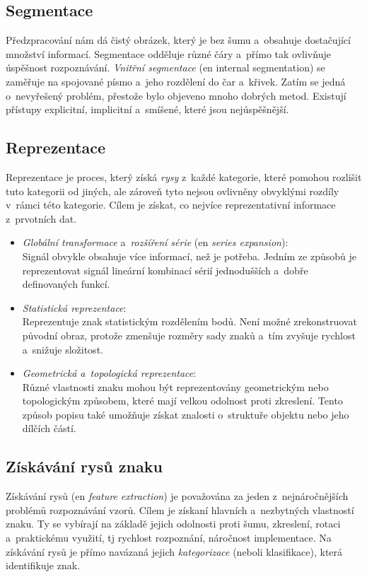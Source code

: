 \documentclass[12pt,oneside]{report}			%
\begin{document}
	\subsection{Segmentace}
	\label{sec:extraction}
	Předzpracování nám dá čistý obrázek, který je bez šumu a~obsahuje dostačující množství informací. Segmentace odděluje různé čáry a~přímo tak ovlivňuje úspěšnost rozpoznávání. \emph{Vnitřní segmentace} (\gls{en} internal segmentation) se zaměřuje na spojované písmo a~jeho rozdělení do čar a~křivek. Zatím se jedná o~nevyřešený problém, přestože bylo objeveno mnoho dobrých metod. Existují přístupy explicitní, implicitní a~smíšené, které jsou nejúspěšnější.\parencite[\gls{s} 22]{chaudhuri2017optical}
	\subsection{Reprezentace}
	Reprezentace je proces, který získá \emph{rysy} z~každé kategorie, které pomohou rozlišit tuto kategorii od jiných, ale zároveň tyto nejsou ovlivněny obvyklými rozdíly v~rámci této kategorie. Cílem je získat, co nejvíce reprezentativní informace z~prvotních dat.
	\begin{itemize}
	\item{\emph{Globální transformace} a~\emph{rozšíření série} (\gls{en} \emph{series expansion}):\\Signál obvykle obsahuje více informací, než je potřeba. Jedním ze způsobů je reprezentovat signál lineární kombinací sérií jednodušších a~dobře definovaných funkcí.}
	\item{\emph{Statistická reprezentace}:\\ Reprezentuje znak statistickým rozdělením bodů. Není možné zrekonstruovat původní obraz, protože zmenšuje rozměry sady znaků a~tím zvyšuje rychlost a~snižuje složitost.}
	\item{\emph{Geometrická a~topologická reprezentace}: \\Různé vlastnosti znaku mohou být reprezentovány geometrickým nebo topologickým způsobem, které mají velkou odolnost proti zkreslení. Tento způsob popisu také umožňuje získat znalosti o~struktuře objektu nebo jeho dílčích částí.}
	\end{itemize}
	\parencite[\gls{s} 23-28]{chaudhuri2017optical}
	\subsection{Získávání rysů znaku}
	Získávání rysů (\gls{en} \emph{feature extraction}) je považována za jeden z~nejnáročnějších problémů rozpoznávání vzorů. Cílem je získaní hlavních a~nezbytných vlastností znaku. Ty se vybírají na základě jejich odolnosti proti šumu, zkreslení, rotaci a~praktickému využití, \gls{tj} rychlost rozpoznání, náročnost implementace. Na získávání rysů je přímo navázaná jejich \emph{kategorizace} (neboli klasifikace), která identifikuje znak. \parencite[\gls{str} 28-29]{chaudhuri2017optical}
\end{document}
